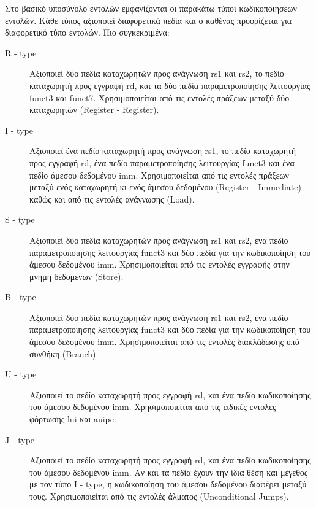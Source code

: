 \documentclass[11pt]{extarticle}
\begin{document}
\newpage
Στο βασικό υποσύνολο εντολών εμφανίζονται οι παρακάτω τύποι κωδικοποιήσεων εντολών.
Κάθε τύπος αξιοποιεί διαφορετικά πεδία και ο καθένας προορίζεται για διαφορετικό τύπο εντολών. 
Πιο συγκεκριμένα:
\begin{description}
    \item[R - type] Αξιοποιεί δύο πεδία καταχωρητών προς ανάγνωση rs1 και rs2, το πεδίο καταχωρητή προς εγγραφή rd, και τα δύο πεδία παραμετροποίησης λειτουργίας funct3 και funct7.
    Χρησιμοποιείται από τις εντολές πράξεων μεταξύ δύο καταχωρητών (Register - Register).
    \item[I - type] Αξιοποιεί ένα πεδίο καταχωρητή προς ανάγνωση rs1, το πεδίο καταχωρητή προς εγγραφή rd, ένα πεδίο παραμετροποίησης λειτουργίας funct3 και ένα πεδίο άμεσου δεδομένου imm.
    Χρησιμοποιείται από τις εντολές πράξεων μεταξύ ενός καταχωρητή κι ενός άμεσου δεδομένου (Register - Immediate) καθώς και από τις εντολές ανάγνωσης (Load).
    \item[S - type] Αξιοποιεί δύο πεδία καταχωρητών προς ανάγνωση rs1 και rs2, ένα πεδίο παραμετροποίησης λειτουργίας funct3 και δύο πεδία για την κωδικοποίηση του άμεσου δεδομένου imm\footnotemark.
    Χρησιμοποιείται από τις εντολές εγγραφής στην μνήμη δεδομένων (Store).
    \item [B - type] Αξιοποιεί δύο πεδία καταχωρητών προς ανάγνωση rs1 και rs2, ένα πεδίο παραμετροποίησης λειτουργίας funct3 και δύο πεδία για την κωδικοποίηση του άμεσου δεδομένου imm.
    Χρησιμοποιείται από τις εντολές διακλάδωσης υπό συνθήκη (Branch).
    \item [U - type] Αξιοποιεί το πεδίο καταχωρητή προς εγγραφή rd, και ένα πεδίο κωδικοποίησης του άμεσου δεδομένου imm.
    Χρησιμοποιείται από τις ειδικές εντολές φόρτωσης lui και auipc.
    \item [J - type] Αξιοποιεί το πεδίο καταχωρητή προς εγγραφή rd, και ένα πεδίο κωδικοποίησης του άμεσου δεδομένου imm. Αν και τα πεδία έχουν την ίδια θέση και μέγεθος με τον τύπο I - type, η κωδικοποίηση του άμεσου δεδομένου διαφέρει μεταξύ τους.
    Χρησιμοποιείται από τις εντολές άλματος (Unconditional Jumps).
\end{description}
\end{document}
